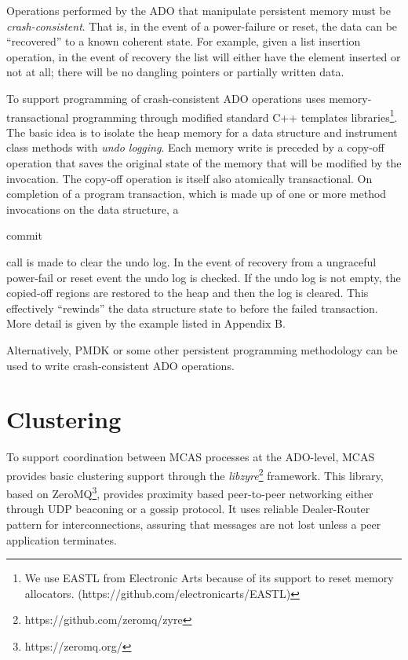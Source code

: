 \documentclass[letterpaper,twocolumn,10pt]{article}
\newcommand{\code}[1]{\begin{ttcodefont}#1\end{ttcodefont}}
\begin{document}
Operations performed by the ADO that manipulate persistent memory must
be \textit{crash-consistent}.  That is, in the event of a
power-failure or reset, the data can be
``recovered'' to a known coherent state.  For example, given a list
insertion operation, in the event of recovery the list will either
have the element inserted or not at all; there will be no dangling
pointers or partially written data.

To support programming of crash-consistent ADO operations uses
memory-transactional programming through modified standard C++
templates libraries\footnote{We use EASTL from Electronic
Arts  because of its support to reset memory allocators.
(https://github.com/electronicarts/EASTL)}. 
The basic idea is to isolate the heap
memory for a data structure and instrument class methods with
\textit{undo logging}.  Each memory write is preceded by a copy-off
operation that saves the original state of the memory that will be
modified by the invocation. The copy-off operation is itself also
atomically transactional.  On completion of a program transaction,
which is made up of one or more method invocations on the data
structure, a \code{commit} call is made to clear the undo log.  In the
event of recovery from a ungraceful power-fail or reset event the undo
log is checked.  If the undo log is not empty, the copied-off regions
are restored to the heap and then the log is cleared.  This
effectively ``rewinds'' the data structure state to before the failed
transaction. More detail is given by the example listed in Appendix B.

Alternatively, PMDK or some other persistent programming methodology can
be used to write crash-consistent ADO operations. 


\section{Clustering}

To support coordination between MCAS processes at the ADO-level, MCAS
provides basic clustering support through the
\textit{libzyre}\footnote{https://github.com/zeromq/zyre} framework.
This library, based on ZeroMQ\footnote{https://zeromq.org/}, provides
proximity based peer-to-peer networking either through UDP beaconing
or a gossip protocol.  It uses reliable Dealer-Router pattern for
interconnections, assuring that messages are not lost unless a peer
application terminates.
\end{document}
